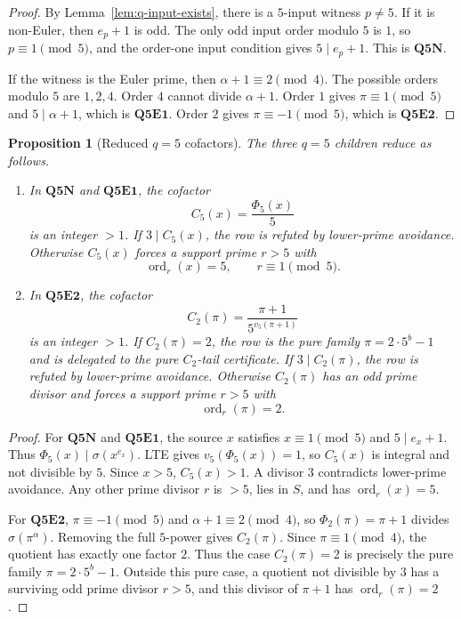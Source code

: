 \documentclass[11pt]{article}
\newtheorem{proposition}[theorem]{Proposition}
\theoremstyle{definition}
\theoremstyle{remark}
\DeclareMathOperator{\ord}{ord}
\begin{document}
\begin{proof}
By Lemma~\ref{lem:q-input-exists}, there is a \(5\)-input witness \(p\ne5\).
If it is non-Euler, then \(e_p+1\) is odd.  The only odd input order modulo
\(5\) is \(1\), so \(p\equiv1\pmod5\), and the order-one input condition gives
\(5\mid e_p+1\).  This is \(\mathbf{Q5N}\).

If the witness is the Euler prime, then \(\alpha+1\equiv2\pmod4\).  The
possible orders modulo \(5\) are \(1,2,4\).  Order \(4\) cannot divide
\(\alpha+1\).  Order \(1\) gives \(\pi\equiv1\pmod5\) and
\(5\mid\alpha+1\), which is \(\mathbf{Q5E1}\).  Order \(2\) gives
\(\pi\equiv-1\pmod5\), which is \(\mathbf{Q5E2}\).
\end{proof}

\begin{proposition}[Reduced \(q=5\) cofactors]
\label{prop:q5-reduced-cofactors}
The three \(q=5\) children reduce as follows.
\begin{enumerate}[label=(\roman*),leftmargin=2.2em]
\item In \(\mathbf{Q5N}\) and \(\mathbf{Q5E1}\), the cofactor
\[
  C_5(x)=\frac{\Phi_5(x)}5
\]
is an integer \(>1\).  If \(3\mid C_5(x)\), the row is refuted by lower-prime
avoidance.  Otherwise \(C_5(x)\) forces a support prime \(r>5\) with
\[
  \ord_r(x)=5,\qquad r\equiv1\pmod5.
\]
\item In \(\mathbf{Q5E2}\), the cofactor
\[
  C_2(\pi)=\frac{\pi+1}{5^{v_5(\pi+1)}}
\]
is an integer \(>1\).  If \(C_2(\pi)=2\), the row is the pure family
\(\pi=2\cdot5^b-1\) and is delegated to the pure \(C_2\)-tail certificate.  If
\(3\mid C_2(\pi)\), the row is refuted by lower-prime avoidance.  Otherwise
\(C_2(\pi)\) has an odd prime divisor and forces a support prime \(r>5\) with
\[
  \ord_r(\pi)=2.
\]
\end{enumerate}
\end{proposition}

\begin{proof}
For \(\mathbf{Q5N}\) and \(\mathbf{Q5E1}\), the source \(x\) satisfies
\(x\equiv1\pmod5\) and \(5\mid e_x+1\).  Thus \(\Phi_5(x)\mid\sigma(x^{e_x})\).
LTE gives \(v_5(\Phi_5(x))=1\), so \(C_5(x)\) is integral and not divisible by
\(5\).  Since \(x>5\), \(C_5(x)>1\).  A divisor \(3\) contradicts
lower-prime avoidance.  Any other prime divisor \(r\) is \(>5\), lies in \(S\),
and has \(\ord_r(x)=5\).

For \(\mathbf{Q5E2}\), \(\pi\equiv-1\pmod5\) and
\(\alpha+1\equiv2\pmod4\), so \(\Phi_2(\pi)=\pi+1\) divides
\(\sigma(\pi^\alpha)\).  Removing the full \(5\)-power gives \(C_2(\pi)\).
Since \(\pi\equiv1\pmod4\), the quotient has exactly one factor \(2\).  Thus
the case \(C_2(\pi)=2\) is precisely the pure family
\(\pi=2\cdot5^b-1\).  Outside this pure case, a quotient not divisible by \(3\)
has a surviving odd prime divisor \(r>5\), and this divisor of \(\pi+1\) has
\(\ord_r(\pi)=2\).
\end{proof}
\end{document}
